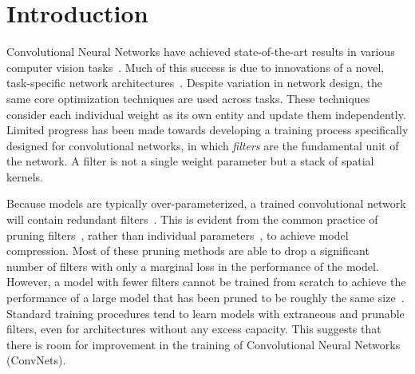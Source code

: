 \section{Introduction}

Convolutional Neural Networks have achieved state-of-the-art results in various computer vision tasks~\cite{He2016DeepRL, Lin2018FocalLF}. 
Much of this success is due to innovations of a novel, task-specific network architectures~\cite{He2017MaskR, Ronneberger2015UNetCN}.
Despite variation in network design, the same core optimization techniques are used across tasks.
These techniques consider each individual weight as its own entity and update them independently.
Limited progress has been made towards developing a training process specifically designed for convolutional networks, in which \textit{filters} are the fundamental unit of the network.
A filter is not a single weight parameter but a stack of spatial kernels.

Because models are typically over-parameterized, a trained convolutional network will contain redundant filters~\cite{Cogswell2015ReducingOI, Li2016PruningFF}. %
This is evident from the common practice of pruning filters~\cite{He2017ChannelPF, Anwar2017StructuredPO, Li2016PruningFF, Molchanov2016PruningCN, Liu2017LearningEC, Luo2017ThiNetAF}, rather than individual parameters~\cite{Han2015DeepCC}, to achieve model compression.
Most of these pruning methods are able to drop a significant number of filters with only a marginal loss in the performance of the model.
However, a model with fewer filters cannot be trained from scratch to achieve the performance of a large model that has been pruned to be roughly the same size~\cite{Li2016PruningFF, Luo2017ThiNetAF, Zhu2017ToPO}.
Standard training procedures tend to learn models with extraneous and prunable filters, even for architectures without any excess capacity.
This suggests that there is room for improvement in the training of Convolutional Neural Networks (ConvNets).

